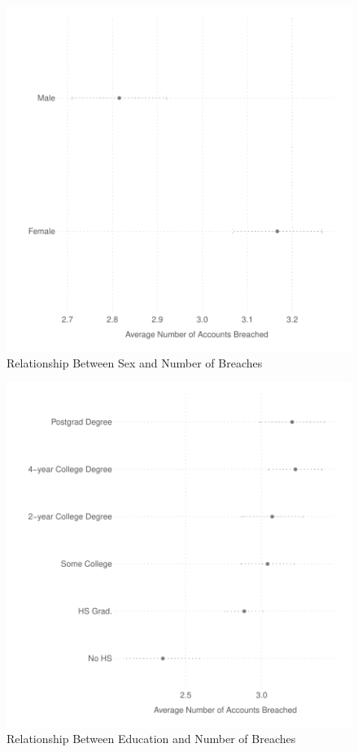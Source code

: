 \documentclass[sigconf]{acmart}
\begin{document}
\begin{figure}[H]
  \centering
   \caption{Relationship Between Sex and Number of Breaches  
  \label{fig:sex_breaches}}
    \includegraphics[scale=.75]{../figs/sex_pwned.pdf}
\end{figure}
\clearpage

\begin{figure}[H]
  \centering
   \caption{Relationship Between Education and Number of Breaches 
  \label{fig:educ_breaches}}
    \includegraphics[scale=.75]{../figs/educ_pwned.pdf}
\end{figure}
\clearpage
\end{document}
